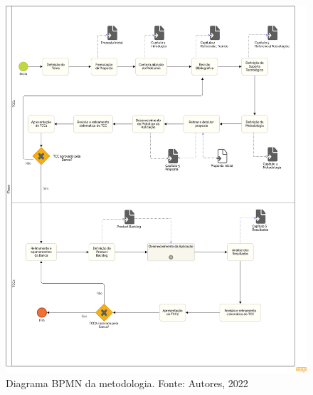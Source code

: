 \begin{figure}[H]
    \begin{center}
        \includegraphics[scale=0.25]{figuras/Metodologia/bpmn_geral.png}
        \caption{{Diagrama BPMN da metodologia. Fonte: Autores, 2022}}
        \label{fig:bpmn_geral}
    \end{center}
\end{figure}

